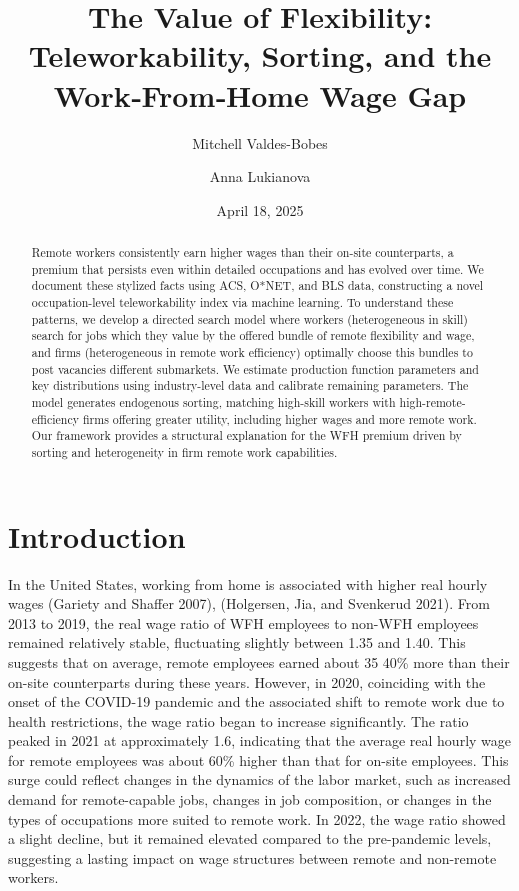 \documentclass[
  11pt,
  letterpaper,
  DIV=11,
  numbers=noendperiod]{scrartcl}
\title{The Value of Flexibility: Teleworkability, Sorting, and the
Work‑From‑Home Wage Gap}
\author{Mitchell Valdes-Bobes \and Anna Lukianova}
\date{April 18, 2025}
\theoremstyle{plain}
\theoremstyle{remark}
\begin{document}
\maketitle
\begin{abstract}
Remote workers consistently earn higher wages than their on-site
counterparts, a premium that persists even within detailed occupations
and has evolved over time. We document these stylized facts using ACS,
O*NET, and BLS data, constructing a novel occupation-level
teleworkability index via machine learning. To understand these
patterns, we develop a directed search model where workers
(heterogeneous in skill) search for jobs which they value by the offered
bundle of remote flexibility and wage, and firms (heterogeneous in
remote work efficiency) optimally choose this bundles to post vacancies
different submarkets. We estimate production function parameters and key
distributions using industry-level data and calibrate remaining
parameters. The model generates endogenous sorting, matching high-skill
workers with high-remote-efficiency firms offering greater utility,
including higher wages and more remote work. Our framework provides a
structural explanation for the WFH premium driven by sorting and
heterogeneity in firm remote work capabilities.
\end{abstract}


\section{Introduction}\label{introduction}

In the United States, working from home is associated with higher real
hourly wages (Gariety and Shaffer 2007), (Holgersen, Jia, and Svenkerud
2021). From 2013 to 2019, the real wage ratio of WFH employees to
non-WFH employees remained relatively stable, fluctuating slightly
between 1.35 and 1.40. This suggests that on average, remote employees
earned about 35 40\% more than their on-site counterparts during these
years. However, in 2020, coinciding with the onset of the COVID-19
pandemic and the associated shift to remote work due to health
restrictions, the wage ratio began to increase significantly. The ratio
peaked in 2021 at approximately 1.6, indicating that the average real
hourly wage for remote employees was about 60\% higher than that for
on-site employees. This surge could reflect changes in the dynamics of
the labor market, such as increased demand for remote-capable jobs,
changes in job composition, or changes in the types of occupations more
suited to remote work. In 2022, the wage ratio showed a slight decline,
but it remained elevated compared to the pre-pandemic levels, suggesting
a lasting impact on wage structures between remote and non-remote
workers.
\end{document}
